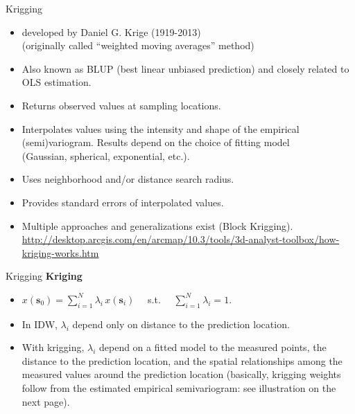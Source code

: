 \documentclass{beamer}
\begin{document}
\begin{frame}{Krigging}
\begin{itemize}
    \item developed by Daniel G. Krige (1919-2013) \\(originally called ``weighted moving averages'' method) 
    \smallskip
    \item Also known as BLUP (best linear unbiased prediction) and closely related to OLS estimation.
    \smallskip
    \item Returns observed values at sampling locations.
    \smallskip
    \item Interpolates values using the intensity and shape of the empirical (semi)variogram. Results depend on the choice of fitting model \\(Gaussian, spherical, exponential, etc.).
    \smallskip
    \item Uses neighborhood and/or distance search radius.
    \smallskip
    \item Provides standard errors of interpolated values.
    \smallskip
    \item Multiple approaches and generalizations exist (Block Krigging). \\
    \url{http://desktop.arcgis.com/en/arcmap/10.3/tools/3d-analyst-toolbox/how-kriging-works.htm}
\end{itemize}
\end{frame}
\begin{frame}{Krigging}
\textbf{Kriging}\\ \medskip
\begin{itemize}
    \item $x(\bm{s}_0)= \sum_{i=1}^N \lambda_i \, x(\bm{s}_i)$ ~~s.t.~~ $\sum_{i=1}^N \lambda_i = 1$. 
    \bigskip
    \item In IDW, $\lambda_i$ depend only on distance to the prediction location.\\
    \bigskip
    \item  With krigging, $\lambda_i$ depend on a fitted model to the measured points, the distance to the prediction location, and the spatial relationships among the measured values around the prediction location (basically, krigging weights follow from the estimated empirical semivariogram: see illustration on the next page).
\end{itemize}
\end{frame}
\end{document}
